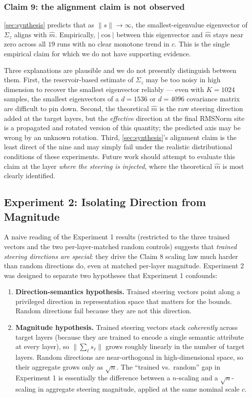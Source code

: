 \subsubsection{Claim 9: the alignment claim is not observed}

\ref{sec:synthesis} predicts that as $\|s\| \to \infty$, the smallest-eigenvalue eigenvector of $\Sigma_z$ aligns with $\hat{m}$. Empirically, $|\cos|$ between this eigenvector and $\hat{m}$ stays near zero across all $19$ runs with no clear monotone trend in $c$. This is the single empirical claim for which we do not have supporting evidence.

Three explanations are plausible and we do not presently distinguish between them. First, the reservoir-based estimate of $\Sigma_z$ may be too noisy in high dimension to recover the smallest eigenvector reliably --- even with $K = 1024$ samples, the smallest eigenvectors of a $d = 1536$ or $d = 4096$ covariance matrix are difficult to pin down. Second, the theoretical $\hat{m}$ is the raw steering direction added at the target layers, but the \emph{effective} direction at the final RMSNorm site is a propagated and rotated version of this quantity; the predicted axis may be wrong by an unknown rotation. Third, \ref{sec:synthesis}'s alignment claim is the least direct of the nine and may simply fail under the realistic distributional conditions of these experiments. Future work should attempt to evaluate this claim at the layer \emph{where the steering is injected}, where the theoretical $\hat{m}$ is most clearly identified.

\subsection{Experiment 2: Isolating Direction from Magnitude}
\label{sec:empirical-agg-matched}

A naive reading of the Experiment 1 results (restricted to the three trained vectors and the two per-layer-matched random controls) suggests that \emph{trained steering directions are special}: they drive the Claim 8 scaling law much harder than random directions do, even at matched per-layer magnitude. Experiment 2 was designed to separate two hypotheses that Experiment 1 confounds:
\begin{enumerate}
  \item \textbf{Direction-semantics hypothesis.} Trained steering vectors point along a privileged direction in representation space that matters for the bounds. Random directions fail because they are not this direction.
  \item \textbf{Magnitude hypothesis.} Trained steering vectors stack \emph{coherently} across target layers (because they are trained to encode a single semantic attribute at every layer), so $\|\sum_\ell s_\ell\|$ grows roughly linearly in the number of target layers. Random directions are near-orthogonal in high-dimensional space, so their aggregate grows only as $\sqrt{n}$. The ``trained vs.\ random'' gap in Experiment 1 is essentially the difference between a $n$-scaling and a $\sqrt{n}$-scaling in aggregate steering magnitude, applied at the same nominal scale $c$.
\end{enumerate}

